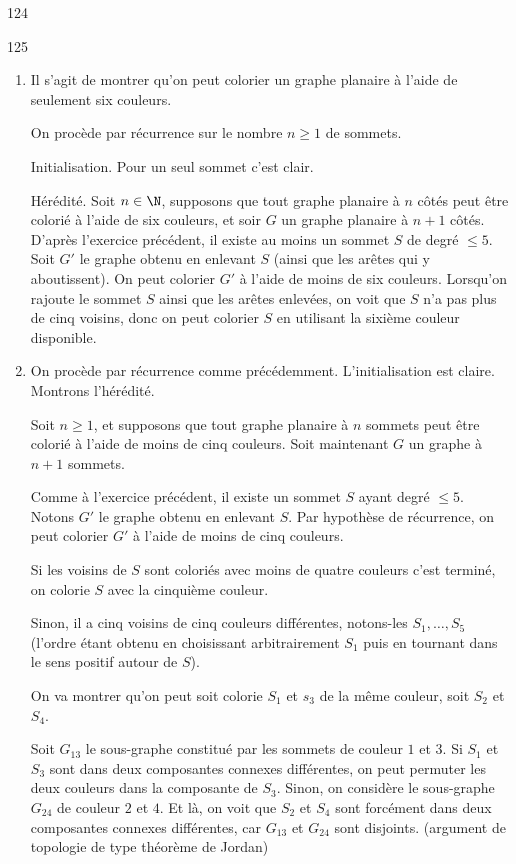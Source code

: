 \begin{Soln}{124}

\end{Soln}
\begin{Soln}{125}
\begin{enumerate}
\item Il s'agit de montrer qu'on peut colorier un graphe planaire à l'aide de seulement six couleurs.

On procède par récurrence sur le nombre $n\geq 1$ de sommets.

Initialisation. Pour un seul sommet c'est clair.

Hérédité. Soit $n\in \N$, supposons que tout graphe planaire à $n$ côtés peut être colorié à l'aide de six couleurs, et soir $G$ un graphe planaire à $n+1$ côtés. D'après l'exercice précédent, il existe au moins un sommet $S$ de degré $\leq 5$. Soit $G'$ le graphe obtenu en enlevant $S$ (ainsi que les arêtes qui y aboutissent). On peut colorier $G'$ à l'aide de moins de six couleurs. Lorsqu'on rajoute le sommet $S$ ainsi que les arêtes enlevées, on voit que $S$ n'a pas plus de cinq voisins, donc on peut colorier $S$ en utilisant la sixième couleur disponible.

\item On procède par récurrence comme précédemment. L'initialisation est claire. Montrons l'hérédité.

Soit $n\geq 1$, et supposons que tout graphe planaire à $n$ sommets peut être colorié à l'aide de moins de cinq couleurs. Soit maintenant $G$ un graphe à $n+1$ sommets.

Comme à l'exercice précédent, il existe un sommet $S$ ayant degré $\leq 5$. Notons $G'$ le graphe obtenu en enlevant $S$. Par hypothèse de récurrence, on peut colorier $G'$ à l'aide de moins de cinq couleurs.

Si les voisins de $S$ sont coloriés avec moins de quatre couleurs c'est terminé, on colorie $S$ avec la cinquième couleur.

Sinon, il a cinq voisins de cinq couleurs différentes, notons-les $S_1, \dots, S_5$ (l'ordre étant obtenu en choisissant arbitrairement $S_1$ puis en tournant dans le sens positif autour de $S$).

On va montrer qu'on peut soit colorie $S_1$ et $s_3$ de la même couleur, soit $S_2$ et $S_4$.

Soit $G_{13}$ le sous-graphe constitué par les sommets de couleur $1$ et $3$. Si $S_1$ et $S_3$ sont dans deux composantes connexes différentes, on peut permuter les deux couleurs dans la composante de $S_3$.
Sinon, on considère le sous-graphe $G_{24}$ de couleur $2$ et $4$. Et là, on voit que $S_2$ et $S_4$ sont forcément dans deux composantes connexes différentes, car $G_{13}$ et $G_{24}$ sont disjoints. (argument de topologie de type théorème de Jordan)
\end{enumerate}
\end{Soln}
